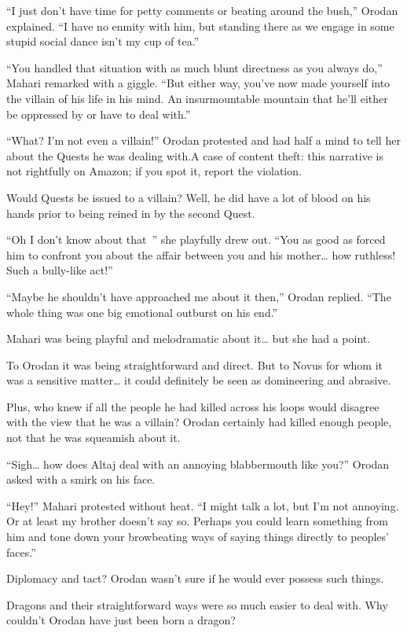 \documentclass[a4paper,10pt]{book}
\begin{document}
“I just don’t have time for petty comments or beating around the bush,” Orodan explained. “I have no enmity with him, but standing there as we engage in some stupid social dance isn’t my cup of tea.”\par
“You handled that situation with as much blunt directness as you always do,” Mahari remarked with a giggle. “But either way, you’ve now made yourself into the villain of his life in his mind. An insurmountable mountain that he’ll either be oppressed by or have to deal with.”\par
“What? I’m not even a villain!” Orodan protested and had half a mind to tell her about the Quests he was dealing with.A case of content theft: this narrative is not rightfully on Amazon; if you spot it, report the violation.\par
Would Quests be issued to a villain? Well, he did have a lot of blood on his hands prior to being reined in by the second Quest.\par
“Oh I don’t know about that~” she playfully drew out. “You as good as forced him to confront you about the affair between you and his mother… how ruthless! Such a bully-like act!”\par
“Maybe he shouldn’t have approached me about it then,” Orodan replied. “The whole thing was one big emotional outburst on his end.”\par
Mahari was being playful and melodramatic about it… but she had a point.\par
To Orodan it was being straightforward and direct. But to Novus for whom it was a sensitive matter… it could definitely be seen as domineering and abrasive.\par
Plus, who knew if all the people he had killed across his loops would disagree with the view that he was a villain? Orodan certainly had killed enough people, not that he was squeamish about it.\par
“Sigh… how does Altaj deal with an annoying blabbermouth like you?” Orodan asked with a smirk on his face.\par
“Hey!” Mahari protested without heat. “I might talk a lot, but I’m not annoying. Or at least my brother doesn’t say so. Perhaps you could learn something from him and tone down your browbeating ways of saying things directly to peoples’ faces.”\par
Diplomacy and tact? Orodan wasn’t sure if he would ever possess such things.\par
Dragons and their straightforward ways were so much easier to deal with. Why couldn’t Orodan have just been born a dragon?\par
\end{document}
